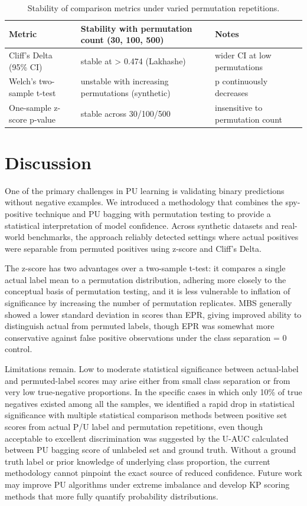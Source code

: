 \documentclass[11pt]{article}
\begin{document}
\begin{table}[h]
\centering
\caption{Stability of comparison metrics under varied permutation repetitions.}
\begin{tabular}{lll}
\toprule
Metric & Stability with permutation count (30, 100, 500) & Notes \\
\midrule
Cliff's Delta (95\% CI) & stable at > 0.474 (Lakhashe) & wider CI at low permutations \\
Welch's two-sample t-test & unstable with increasing permutations (synthetic) & p continuously decreases \\
One-sample z-score p-value & stable across 30/100/500 & insensitive to permutation count \\
\bottomrule
\end{tabular}
\end{table}

\section{Discussion}
One of the primary challenges in PU learning is validating binary predictions without negative examples. We introduced a methodology that combines the spy-positive technique and PU bagging with permutation testing to provide a statistical interpretation of model confidence. Across synthetic datasets and real-world benchmarks, the approach reliably detected settings where actual positives were separable from permuted positives using z-score and Cliff's Delta.

The z-score has two advantages over a two-sample t-test: it compares a single actual label mean to a permutation distribution, adhering more closely to the conceptual basis of permutation testing, and it is less vulnerable to inflation of significance by increasing the number of permutation replicates. MBS generally showed a lower standard deviation in scores than EPR, giving improved ability to distinguish actual from permuted labels, though EPR was somewhat more conservative against false positive observations under the class separation = 0 control.

Limitations remain. Low to moderate statistical significance between actual-label and permuted-label scores may arise either from small class separation or from very low true-negative proportions. In the specific cases in which only 10\% of true negatives existed among all the samples, we identified a rapid drop in statistical significance with multiple statistical comparison methods between positive set scores from actual P/U label and permutation repetitions, even though acceptable to excellent discrimination was suggested by the U-AUC calculated between PU bagging score of unlabeled set and ground truth. Without a ground truth label or prior knowledge of underlying class proportion, the current methodology cannot pinpoint the exact source of reduced confidence. Future work may improve PU algorithms under extreme imbalance and develop KP scoring methods that more fully quantify probability distributions.
\end{document}
